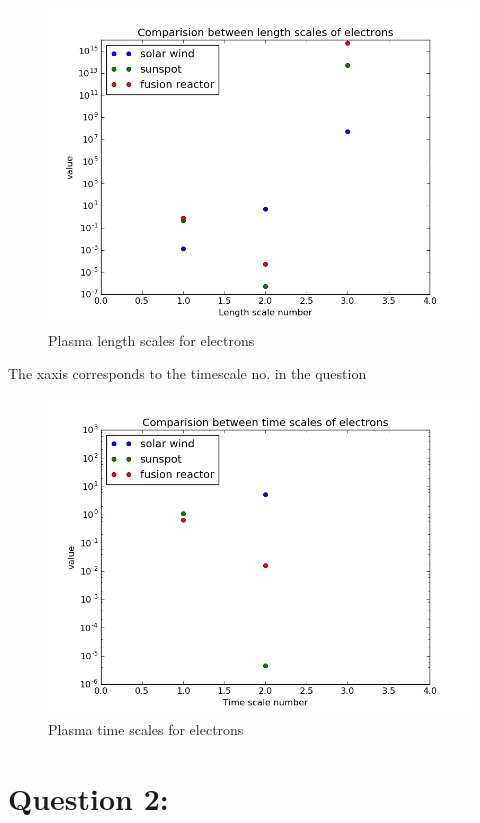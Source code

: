 \documentclass[11pt, a4paper]{article}
\begin{document}
\begin{figure}[H]
 \centering
 \includegraphics[scale = 0.6]{ques1_len2.png}
 \caption{Plasma length scales for electrons}
\end{figure}

The xaxis corresponds to the timescale no. in the question
\begin{figure}[H]
 \centering
 \includegraphics[scale = 0.6]{ques1_timee.png}
 \caption{Plasma time scales for electrons}
\end{figure}

\section{Question 2:}
\end{document}
